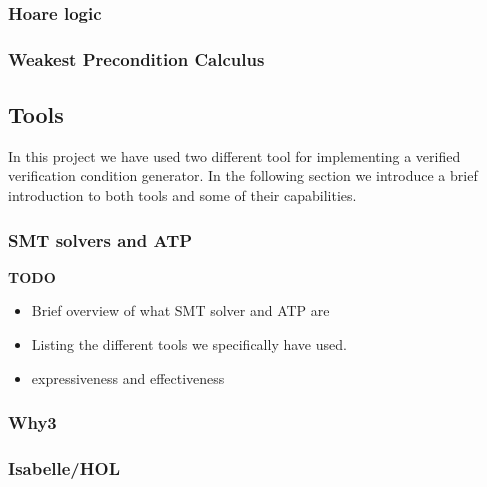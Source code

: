 \subsubsection{Hoare logic}\label{sec:hoare}


\subsubsection{Weakest Precondition Calculus}\label{sec:wp}


\subsection{Tools}
In this project we have used two different tool for implementing a verified verification condition generator.
In the following section we introduce a brief introduction to both tools and some of their capabilities.

\subsubsection{SMT solvers and ATP}

\textbf{TODO}

\begin{itemize}
  \item Brief overview of what SMT solver and ATP are
  \item Listing the different tools we specifically have used.
  \item expressiveness and effectiveness
\end{itemize}

\subsubsection{Why3}\label{sec:why3}


\subsubsection{Isabelle/HOL}\label{sec:isabelle}

